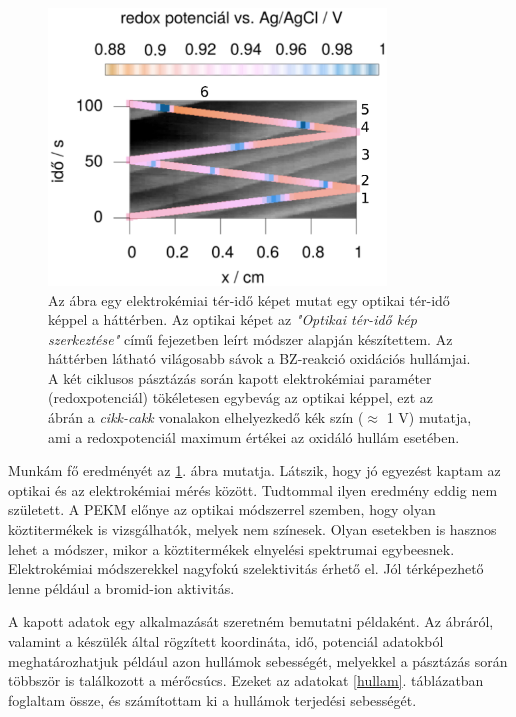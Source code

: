 \begin{figure}
\centering
\includegraphics[width=0.8\textwidth]{img/spacetime2.eps}
\caption{Az ábra egy elektrokémiai tér-idő képet mutat egy optikai tér-idő képpel a háttérben. Az optikai képet az \emph{"Optikai tér-idő kép szerkeztése"} című fejezetben leírt módszer alapján készítettem. Az háttérben látható világosabb sávok a BZ-reakció oxidációs hullámjai. A két ciklusos pásztázás során kapott elektrokémiai paraméter (redoxpotenciál) tökéletesen egybevág az optikai képpel, ezt az ábrán a \emph{cikk-cakk} vonalakon elhelyezkedő kék szín ($\approx$ 1 V) mutatja, ami a redoxpotenciál maximum értékei az oxidáló hullám esetében.}
\label{fig:spatiotemporal}
\end{figure}
Munkám fő eredményét az \ref{fig:spatiotemporal}. ábra mutatja. Látszik, hogy jó egyezést kaptam az optikai és az elektrokémiai mérés között. Tudtommal ilyen eredmény eddig nem született. A PEKM előnye az optikai módszerrel szemben, hogy olyan köztitermékek is vizsgálhatók, melyek nem színesek. Olyan esetekben is hasznos lehet a módszer, mikor a köztitermékek elnyelési spektrumai egybeesnek. Elektrokémiai módszerekkel nagyfokú szelektivitás érhető el. Jól térképezhető lenne például a bromid-ion aktivitás.

A kapott adatok egy alkalmazását szeretném bemutatni példaként. Az ábráról, valamint a készülék által rögzített koordináta, idő, potenciál adatokból meghatározhatjuk például azon hullámok sebességét, melyekkel a pásztázás során többször is találkozott a mérőcsúcs. Ezeket az adatokat \ref{hullam}. táblázatban foglaltam össze, és számítottam ki a hullámok terjedési sebességét.

